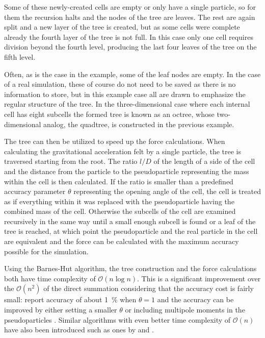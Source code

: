 \documentclass[english, oneside]{HYgradu}
\begin{document}
Some of these newly-created cells are empty or only have a single particle, so for them the recursion halts and the nodes of the tree are leaves. The rest are again split and a new layer of the tree is created, but as some cells were complete already the fourth layer of the tree is not full. In this case only one cell requires division beyond the fourth level, producing the last four leaves of the tree on the fifth level.

Often, as is the case in the example, some of the leaf nodes are empty. In the case of a real simulation, these of course do not need to be saved as there is no information to store, but in this example case all are drawn to emphasize the regular structure of the tree. In the three-dimensional case where each internal cell has eight subcells the formed tree is known as an octree, whose two-dimensional analog, the quadtree, is constructed in the previous example.

The tree can then be utilized to speed up the force calculations. When calculating the gravitational acceleration felt by a single particle, the tree is traversed starting from the root. The ratio $l/D$ of the length of a side of the cell and the distance from the particle to the pseudoparticle representing the mass within the cell is then calculated. If the ratio is smaller than a predefined accuracy parameter $\theta$ representing the opening angle of the cell, the cell is treated as if everything within it was replaced with the pseudoparticle having the combined mass of the cell. Otherwise the subcells of the cell are examined recursively in the same way until a small enough subcell is found or a leaf of the tree is reached, at which point the pseudoparticle and the real particle in the cell are equivalent and the force can be calculated with the maximum accuracy possible for the simulation.

Using the Barnes-Hut algorithm, the tree construction and the force calculations both have time complexity of $\mathcal{O}(n \log n)$. This is a significant improvement over the $\mathcal{O}(n^2)$ of the direct summation considering that the accuracy cost is fairly small: \citet{barnes1986hierarchical} report accuracy of about 1~\% when $\theta=1$ and the accuracy can be improved by either setting a smaller $\theta$ or including multipole moments in the pseudoparticles \citep{barnes1989error}. Similar algorithms with even better time complexity of $\mathcal{O}(n)$ have also been introduced such as ones by \citet{dehnen2002hierarchical} and \citet{xue1998n}.
\end{document}
